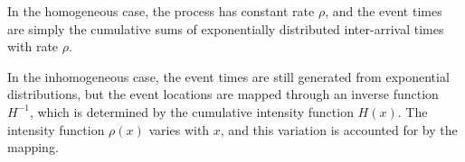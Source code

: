 \documentclass{article}
\begin{document}
In the homogeneous case, the process has constant rate $\rho$, and the event times are simply the cumulative sums of exponentially distributed inter-arrival times with rate $\rho$.

In the inhomogeneous case, the event times are still generated from exponential distributions, but the event locations are mapped through an inverse function $H^{-1}$, which is determined by the cumulative intensity function $H(x)$. 
The intensity function $\rho(x)$ varies with $x$, and this variation is accounted for by the mapping.
\end{document}
